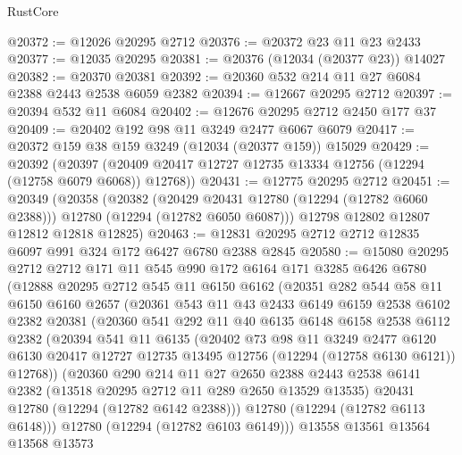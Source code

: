 \begin{lexlean}{RustCore}
\begin{coremodule}
@20372 := @12026 @20295 @2712
@20376 := @20372 @23 @11 @23 @2433
@20377 := @12035 @20295
@20381 := @20376 (@12034 (@20377 @23)) @14027
@20382 := @20370 @20381
@20392 := @20360 @532 @214 @11 @27 @6084 @2388 @2443 @2538 @6059 @2382
@20394 := @12667 @20295 @2712
@20397 := @20394 @532 @11 @6084
@20402 := @12676 @20295 @2712 @2450 @177 @37
@20409 := @20402 @192 @98 @11 @3249 @2477 @6067 @6079
@20417 := @20372 @159 @38 @159 @3249 (@12034 (@20377 @159)) @15029
@20429 := @20392
    (@20397 (@20409 @20417 @12727 @12735 @13334 @12756 (@12294 (@12758 @6079 @6068)) @12768))
@20431 := @12775 @20295 @2712
@20451 := @20349
    (@20358
      (@20382
        (@20429 @20431 @12780 (@12294 (@12782 @6060 @2388)))
        @12780
        (@12294 (@12782 @6050 @6087)))
      @12798
      @12802
      @12807
      @12812
      @12818
      @12825)
@20463 := @12831 @20295 @2712 @2712 @12835 @6097 @991 @324 @172 @6427 @6780 @2388 @2845
@20580 := @15080
    @20295
    @2712
    @2712
    @171
    @11
    @545
    @990
    @172
    @6164
    @171
    @3285
    @6426
    @6780
    (@12888
      @20295
      @2712
      @545
      @11
      @6150
      @6162
      (@20351
        @282
        @544
        @58
        @11
        @6150
        @6160
        @2657
        (@20361
          @543
          @11
          @43
          @2433
          @6149
          @6159
          @2538
          @6102
          @2382
          @20381
          (@20360
            @541
            @292
            @11
            @40
            @6135
            @6148
            @6158
            @2538
            @6112
            @2382
            (@20394
              @541
              @11
              @6135
              (@20402
                @73
                @98
                @11
                @3249
                @2477
                @6120
                @6130
                @20417
                @12727
                @12735
                @13495
                @12756
                (@12294 (@12758 @6130 @6121))
                @12768))
            (@20360
              @290
              @214
              @11
              @27
              @2650
              @2388
              @2443
              @2538
              @6141
              @2382
              (@13518 @20295 @2712 @11 @289 @2650 @13529 @13535)
              @20431
              @12780
              (@12294 (@12782 @6142 @2388)))
            @12780
            (@12294 (@12782 @6113 @6148)))
          @12780
          (@12294 (@12782 @6103 @6149)))
        @13558
        @13561
        @13564
        @13568
        @13573

\end{coremodule}
\end{lexlean}
